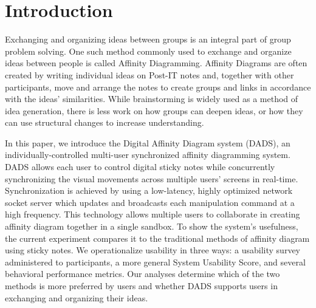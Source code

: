 \documentclass{sigchi}
\begin{document}





\section{Introduction}
Exchanging and organizing ideas between groups is an integral part of group problem solving. One such method commonly used to exchange and organize ideas between people is called Affinity Diagramming\cite{kawakita1991original}. Affinity Diagrams are often created by writing individual ideas on Post-IT notes and, together with other participants, move and arrange the notes to create groups and links in accordance with the ideas' similarities. While brainstorming is widely used as a method of idea generation, there is less work on how groups can deepen ideas, or how they can use structural changes to increase understanding.\cite{dickey2012framespaces}

In this paper, we introduce the Digital Affinity Diagram system (DADS), an individually-controlled multi-user synchronized affinity diagramming system. DADS allows each user to control digital sticky notes while concurrently synchronizing the visual movements across multiple users' screens in real-time. Synchronization is achieved by using a low-latency, highly optimized network socket server which updates and broadcasts each manipulation command at a high frequency. This technology allows multiple users to collaborate in creating affinity diagram together in a single sandbox. To show the system's usefulness, the current experiment compares it to the traditional methods of affinity diagram using sticky notes. We operationalize usability in three ways: a usability survey administered to participants, a more general System Usability Score, and several behavioral performance metrics. Our analyses determine which of the two methods is more preferred by users and whether DADS supports users in exchanging and organizing their ideas.
\end{document}
